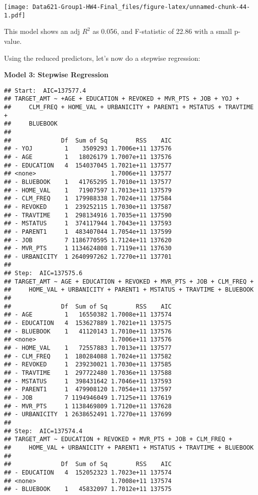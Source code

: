 \documentclass[]{article}
\begin{document}
\texttt{[image: Data621-Group1-HW4-Final\_files/figure-latex/unnamed-chunk-44-1.pdf]}

This model shows an adj \(R^2\) as 0.056, and F-statistic of 22.86 with
a small p-value.

Using the reduced predictors, let's now do a stepwise regression:

\textbf{Model 3: Stepwise Regression }

\begin{verbatim}
## Start:  AIC=137577.4
## TARGET_AMT ~ +AGE + EDUCATION + REVOKED + MVR_PTS + JOB + YOJ + 
##     CLM_FREQ + HOME_VAL + URBANICITY + PARENT1 + MSTATUS + TRAVTIME + 
##     BLUEBOOK
## 
##              Df  Sum of Sq        RSS    AIC
## - YOJ         1    3509293 1.7006e+11 137576
## - AGE         1   18026179 1.7007e+11 137576
## - EDUCATION   4  154037045 1.7021e+11 137577
## <none>                     1.7006e+11 137577
## - BLUEBOOK    1   41765295 1.7010e+11 137577
## - HOME_VAL    1   71907597 1.7013e+11 137579
## - CLM_FREQ    1  179988338 1.7024e+11 137584
## - REVOKED     1  239252115 1.7030e+11 137587
## - TRAVTIME    1  298134916 1.7035e+11 137590
## - MSTATUS     1  374117944 1.7043e+11 137593
## - PARENT1     1  483407044 1.7054e+11 137599
## - JOB         7 1186770595 1.7124e+11 137620
## - MVR_PTS     1 1134624808 1.7119e+11 137630
## - URBANICITY  1 2640997262 1.7270e+11 137701
## 
## Step:  AIC=137575.6
## TARGET_AMT ~ AGE + EDUCATION + REVOKED + MVR_PTS + JOB + CLM_FREQ + 
##     HOME_VAL + URBANICITY + PARENT1 + MSTATUS + TRAVTIME + BLUEBOOK
## 
##              Df  Sum of Sq        RSS    AIC
## - AGE         1   16550382 1.7008e+11 137574
## - EDUCATION   4  153627889 1.7021e+11 137575
## - BLUEBOOK    1   41120143 1.7010e+11 137576
## <none>                     1.7006e+11 137576
## - HOME_VAL    1   72557883 1.7013e+11 137577
## - CLM_FREQ    1  180284088 1.7024e+11 137582
## - REVOKED     1  239230021 1.7030e+11 137585
## - TRAVTIME    1  297722480 1.7036e+11 137588
## - MSTATUS     1  398431642 1.7046e+11 137593
## - PARENT1     1  479908120 1.7054e+11 137597
## - JOB         7 1194946049 1.7125e+11 137619
## - MVR_PTS     1 1138469809 1.7120e+11 137628
## - URBANICITY  1 2638652491 1.7270e+11 137699
## 
## Step:  AIC=137574.4
## TARGET_AMT ~ EDUCATION + REVOKED + MVR_PTS + JOB + CLM_FREQ + 
##     HOME_VAL + URBANICITY + PARENT1 + MSTATUS + TRAVTIME + BLUEBOOK
## 
##              Df  Sum of Sq        RSS    AIC
## - EDUCATION   4  152052323 1.7023e+11 137574
## <none>                     1.7008e+11 137574
## - BLUEBOOK    1   45832097 1.7012e+11 137575

\end{verbatim}
\end{document}

